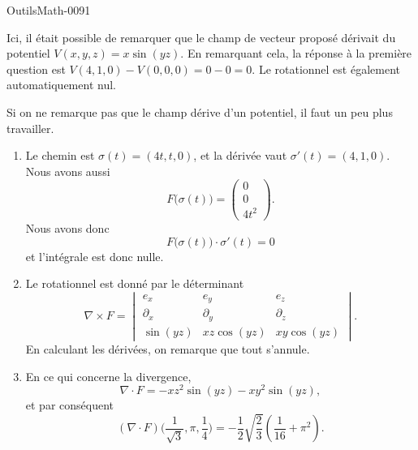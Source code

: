 
\begin{corrige}{OutilsMath-0091}

    Ici, il était possible de remarquer que le champ de vecteur proposé dérivait du potentiel $V(x,y,z)=x\sin(yz)$. En remarquant cela, la réponse à la première question est $V(4,1,0)-V(0,0,0)=0-0=0$. Le rotationnel est également automatiquement nul.

    Si on ne remarque pas que le champ dérive d'un potentiel, il faut un peu plus travailler.

    \begin{enumerate}
        \item
            Le chemin est $\sigma(t)=(4t,t,0)$, et la dérivée vaut $\sigma'(t)=(4,1,0)$. Nous avons aussi
            \begin{equation}
                F\big( \sigma(t) \big)=\begin{pmatrix}
                    0    \\ 
                    0    \\ 
                    4t^2    
                \end{pmatrix}.
            \end{equation}
            Nous avons donc 
            \begin{equation}
                F\big( \sigma(t) \big)\cdot \sigma'(t)=0
            \end{equation}
            et l'intégrale est donc nulle.

        \item
            Le rotationnel est donné par le déterminant
            \begin{equation}
                \nabla\times F=\begin{vmatrix}
                    e_x    &   e_y    &   e_z    \\
                    \partial_x    &   \partial_y    &   \partial_z    \\
                    \sin(yz)    &   xz\cos(yz)    &   xy\cos(yz)
                \end{vmatrix}.
            \end{equation}
            En calculant les dérivées, on remarque que tout s'annule.

        \item
            En ce qui concerne la divergence,
            \begin{equation}
                \nabla\cdot F=-xz^2\sin(yz)-xy^2\sin(yz),
            \end{equation}
            et par conséquent
            \begin{equation}
                (\nabla\cdot F)\big( \frac{1}{ \sqrt{3} },\pi,\frac{1}{ 4 } \big)=-\frac{ 1 }{2}\sqrt{\frac{ 2 }{ 3 }}\left( \frac{1}{ 16 }+\pi^2 \right).
            \end{equation}
            

\end{enumerate}
\end{corrige}
